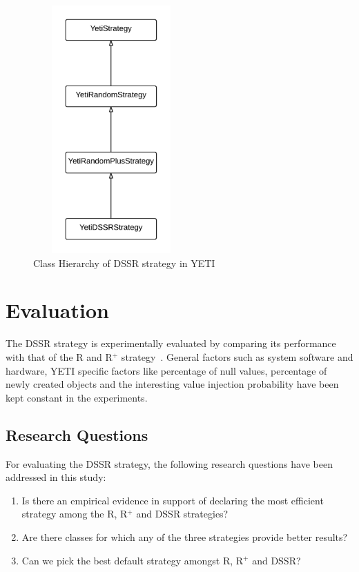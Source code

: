 \begin{figure}[h]
\centering
\includegraphics[width=6cm,height=9.5cm]{chapter4/classHierarchy1.png}
\caption{Class Hierarchy of DSSR strategy in YETI}
\label{fig:hierarchyofDSSR}
\end{figure}






\section{Evaluation}\label{sec:eval}

The DSSR strategy is experimentally evaluated by comparing its performance with that of the R and R$^+$ strategy~\cite{ciupa2007experimental, ciupa2008finding}. General factors such as system software and hardware, YETI specific factors like percentage of null values, percentage of newly created objects and the interesting value injection probability have been kept constant in the experiments.

\subsection{Research Questions}
For evaluating the DSSR strategy, the following research questions have been addressed in this study:
\begin{enumerate}
\item Is there an empirical evidence in support of declaring the most efficient strategy among the R, R$^+$ and DSSR strategies?
\item Are there classes for which any of the three strategies provide better results?
\item Can we pick the best default strategy amongst R, R$^+$ and DSSR?
\end{enumerate}



